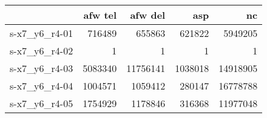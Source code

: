 \begin{tabular}{lrrrr}
\toprule
{} &  afw tel &  afw del &  asp &  nc \\
\midrule
s-x7\_y6\_r4-01 &    716489 &        655863 &    621822 &  5949205 \\
s-x7\_y6\_r4-02 &         1 &             1 &         1 &        1 \\
s-x7\_y6\_r4-03 &   5083340 &      11756141 &   1038018 & 14918905 \\
s-x7\_y6\_r4-04 &   1004571 &       1059412 &    280147 & 16778788 \\
s-x7\_y6\_r4-05 &   1754929 &       1178846 &    316368 & 11977048 \\
\bottomrule
\end{tabular}

